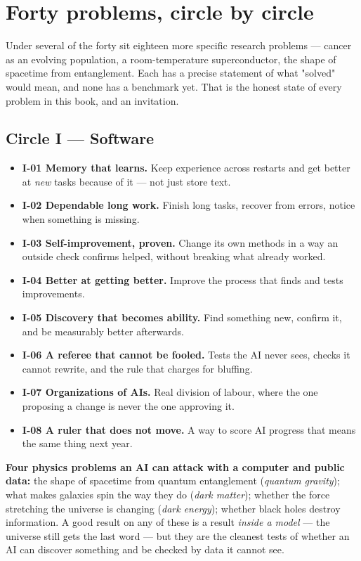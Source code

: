 \documentclass[11pt]{article}
\begin{document}
\section*{Forty problems, circle by circle}

Under several of the forty sit eighteen more specific research problems --- cancer as an evolving population, a room-temperature superconductor, the shape of spacetime from entanglement. Each has a precise statement of what "solved" would mean, and none has a benchmark yet. That is the honest state of every problem in this book, and an invitation.

\subsection*{Circle I --- Software}

\begin{itemize}[leftmargin=1.4em,itemsep=2pt]
\item \textbf{I-01 Memory that learns.} Keep experience across restarts and get better at \emph{new} tasks because of it --- not just store text.
\item \textbf{I-02 Dependable long work.} Finish long tasks, recover from errors, notice when something is missing.
\item \textbf{I-03 Self-improvement, proven.} Change its own methods in a way an outside check confirms helped, without breaking what already worked.
\item \textbf{I-04 Better at getting better.} Improve the process that finds and tests improvements.
\item \textbf{I-05 Discovery that becomes ability.} Find something new, confirm it, and be measurably better afterwards.
\item \textbf{I-06 A referee that cannot be fooled.} Tests the AI never sees, checks it cannot rewrite, and the rule that charges for bluffing.
\item \textbf{I-07 Organizations of AIs.} Real division of labour, where the one proposing a change is never the one approving it.
\item \textbf{I-08 A ruler that does not move.} A way to score AI progress that means the same thing next year.
\end{itemize}

\textbf{Four physics problems an AI can attack with a computer and public data:} the shape of spacetime from quantum entanglement (\emph{quantum gravity}); what makes galaxies spin the way they do (\emph{dark matter}); whether the force stretching the universe is changing (\emph{dark energy}); whether black holes destroy information. A good result on any of these is a result \emph{inside a model} --- the universe still gets the last word --- but they are the cleanest tests of whether an AI can discover something and be checked by data it cannot see.
\end{document}
